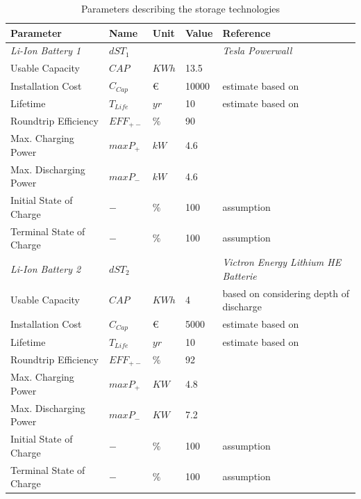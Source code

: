 \documentclass[
	11pt,								%
	DIV10,								%
	a4paper,         					%
	oneside,							%
	headheight=20pt,					%
	footheight=20pt,					%
    parskip=full,						%
    listof=totoc,						%
	bibliography=totoc,					%
	index=totoc,						%
]{scrartcl}
\begin{document}
\begin{table}[H]
	\centering
	\caption{Parameters describing the storage technologies}
	\begin{tabular}{llll|p{7cm}}
		\hline
		\textbf{Parameter}			& \textbf{Name}			& \textbf{Unit}			& \textbf{Value}	&\textbf{Reference}     \\ \hline
		\textit{Li-Ion Battery 1} & $dST_1$ & & &\textit{Tesla Powerwall} \\
		Usable Capacity				   & $CAP$ 		& $KWh$ 				& 13.5 				& \cite{PowerwallTesla2018} 	\\
		Installation Cost              & $C_{Cap}$        	& \euro\ 				& 10000				& estimate based on \cite{PowerwallTesla2018}  \\
		Lifetime			               & $T_{Life}$       	& $yr$  				& 10 				& estimate based on \cite{PowerwallTesla2018} \\
		Roundtrip Efficiency           & $EFF_{+-}$     	& $\%$  				& 90				& \cite{PowerwallTesla2018}  \\
		Max. Charging Power            & $maxP_+$    	& $kW$  				& 4.6 				& \cite{PowerwallTesla2018}     \\
		Max. Discharging Power         & $maxP_-$     	& $kW$   				& 4.6 				& \cite{PowerwallTesla2018}      \\
		Initial State of Charge        & $-$     	& $\%$  				& 100 				& assumption   \\
		Terminal State of Charge       & $-$     	& $\%$  				& 100 				& assumption   \\
		\hline
		\textit{Li-Ion Battery 2} & $dST_2$ & & & \textit{Victron Energy Lithium HE Batterie} \\
		Usable Capacity				   & $CAP$ 		& $KWh$ 				& 4 				& based on \cite{LithiumIonenHEHigh2018} considering depth of discharge\\
		Installation Cost              & $C_{Cap}$     	& \euro\  				& 5000				& estimate based on \cite{VictronEnergyLithium2018}  \\
		Lifetime			               & $T_{Life}$     	& $yr$  				& 10 				& estimate based on \cite{LithiumIonenHEHigh2018}   \\
		Roundtrip Efficiency           & $EFF_{+-}$      	& $\%$  				& 92 				& \cite{LAUINGER201624}   \\
		Max. Charging Power            & $maxP_+$    	& $KW$  				& 4.8				& \cite{LithiumIonenHEHigh2018}  \\
		Max. Discharging Power         & $maxP_-$     	& $KW$   				& 7.2				& \cite{LithiumIonenHEHigh2018}   \\
		Initial State of Charge        & $-$     	& $\%$  				& 100 				& assumption	   \\
		Terminal State of Charge       & $-$    	& $\%$  				& 100 				& assumption   \\	
		\hline
	\end{tabular}
\end{table}
\end{document}
